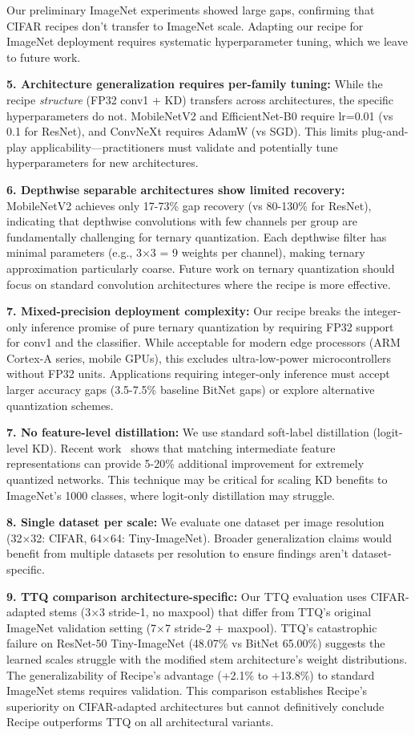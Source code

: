 Our preliminary ImageNet experiments showed large gaps, confirming that CIFAR recipes don't transfer to ImageNet scale. Adapting our recipe for ImageNet deployment requires systematic hyperparameter tuning, which we leave to future work.

\textbf{5. Architecture generalization requires per-family tuning:} While the recipe \textit{structure} (FP32 conv1 + KD) transfers across architectures, the specific hyperparameters do not. MobileNetV2 and EfficientNet-B0 require lr=0.01 (vs 0.1 for ResNet), and ConvNeXt requires AdamW (vs SGD). This limits plug-and-play applicability—practitioners must validate and potentially tune hyperparameters for new architectures.

\textbf{6. Depthwise separable architectures show limited recovery:} MobileNetV2 achieves only 17-73\% gap recovery (vs 80-130\% for ResNet), indicating that depthwise convolutions with few channels per group are fundamentally challenging for ternary quantization. Each depthwise filter has minimal parameters (e.g., 3×3 = 9 weights per channel), making ternary approximation particularly coarse. Future work on ternary quantization should focus on standard convolution architectures where the recipe is more effective.

\textbf{7. Mixed-precision deployment complexity:} Our recipe breaks the integer-only inference promise of pure ternary quantization by requiring FP32 support for conv1 and the classifier. While acceptable for modern edge processors (ARM Cortex-A series, mobile GPUs), this excludes ultra-low-power microcontrollers without FP32 units. Applications requiring integer-only inference must accept larger accuracy gaps (3.5-7.5\% baseline BitNet gaps) or explore alternative quantization schemes.

\textbf{7. No feature-level distillation:} We use standard soft-label distillation (logit-level KD). Recent work~\cite{elthakeb2020dcq} shows that matching intermediate feature representations can provide 5-20\% additional improvement for extremely quantized networks. This technique may be critical for scaling KD benefits to ImageNet's 1000 classes, where logit-only distillation may struggle.

\textbf{8. Single dataset per scale:} We evaluate one dataset per image resolution (32×32: CIFAR, 64×64: Tiny-ImageNet). Broader generalization claims would benefit from multiple datasets per resolution to ensure findings aren't dataset-specific.

\textbf{9. TTQ comparison architecture-specific:} Our TTQ evaluation uses CIFAR-adapted stems (3×3 stride-1, no maxpool) that differ from TTQ's original ImageNet validation setting (7×7 stride-2 + maxpool). TTQ's catastrophic failure on ResNet-50 Tiny-ImageNet (48.07\% vs BitNet 65.00\%) suggests the learned scales struggle with the modified stem architecture's weight distributions. The generalizability of Recipe's advantage (+2.1\% to +13.8\%) to standard ImageNet stems requires validation. This comparison establishes Recipe's superiority on CIFAR-adapted architectures but cannot definitively conclude Recipe outperforms TTQ on all architectural variants.

